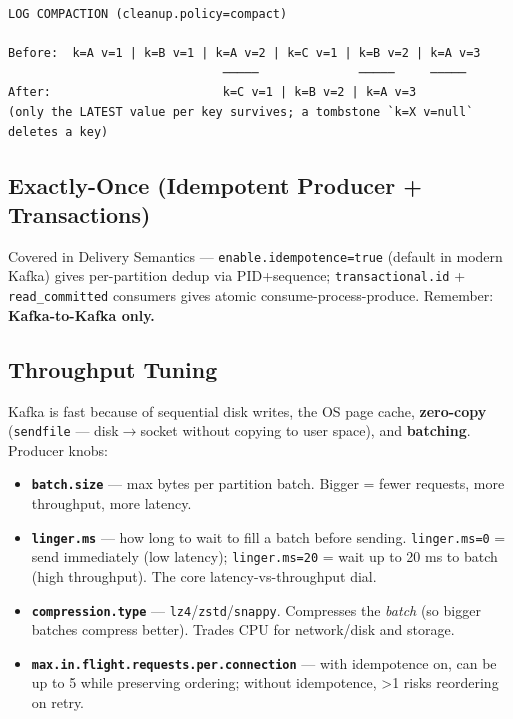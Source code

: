 \documentclass[11pt]{article}
\providecommand{\tightlist}{\setlength{\itemsep}{1pt}\setlength{\parskip}{0pt}}
\begin{document}
\setcodelang{}

\begin{verbatim}
LOG COMPACTION (cleanup.policy=compact)

Before:  k=A v=1 | k=B v=1 | k=A v=2 | k=C v=1 | k=B v=2 | k=A v=3
                              ─────              ─────     ─────
After:                        k=C v=1 | k=B v=2 | k=A v=3
(only the LATEST value per key survives; a tombstone `k=X v=null` deletes a key)
\end{verbatim}

\subsection{Exactly-Once (Idempotent Producer + Transactions)}\label{exactly-once-idempotent-producer--transactions}

Covered in Delivery Semantics --- \texttt{enable.idempotence=true} (default in modern Kafka) gives per-partition dedup via PID+sequence; \texttt{transactional.id} + \texttt{read\_committed} consumers gives atomic consume-process-produce. Remember: \textbf{Kafka-to-Kafka only.}

\subsection{Throughput Tuning}\label{throughput-tuning}

Kafka is fast because of sequential disk writes, the OS page cache, \textbf{zero-copy} (\texttt{sendfile} --- disk\(\rightarrow\)socket without copying to user space), and \textbf{batching}. Producer knobs:

\begin{itemize}
\tightlist
\item
  \textbf{\texttt{batch.size}} --- max bytes per partition batch. Bigger = fewer requests, more throughput, more latency.
\item
  \textbf{\texttt{linger.ms}} --- how long to wait to fill a batch before sending. \texttt{linger.ms=0} = send immediately (low latency); \texttt{linger.ms=20} = wait up to 20 ms to batch (high throughput). The core latency-vs-throughput dial.
\item
  \textbf{\texttt{compression.type}} --- \texttt{lz4}/\texttt{zstd}/\texttt{snappy}. Compresses the \emph{batch} (so bigger batches compress better). Trades CPU for network/disk and storage.
\item
  \textbf{\texttt{max.in.flight.requests.per.connection}} --- with idempotence on, can be up to 5 while preserving ordering; without idempotence, \textgreater1 risks reordering on retry.
\end{itemize}
\end{document}
